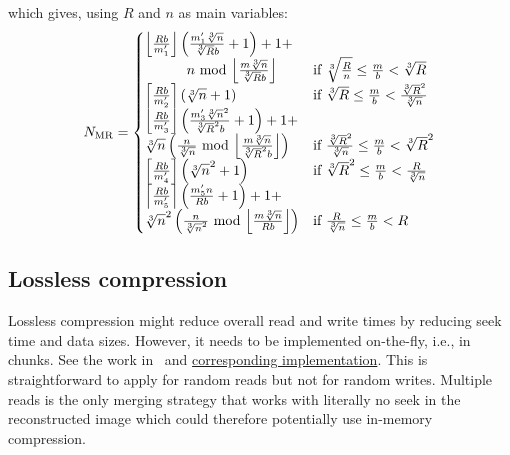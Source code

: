 \documentclass[10pt, conference, compsocconf]{IEEEtran}
\DeclarePairedDelimiter{\ceil}{\lceil}{\rceil}
\DeclarePairedDelimiter{\floor}{\lfloor}{\rfloor}
\begin{document}
which gives, using $R$ and $n$ as main variables:
\begin{equation}
N_\mathrm{MR} =
\begin{cases}
  \floor*{\frac{Rb}{m_1'}}\left(\frac{m_1'\sqrt[3]{n}}{\sqrt[3]{R}b}+1\right)+1+\\
  \quad \quad \quad n \text{ mod }\floor*{\frac{m\sqrt[3]{n}}{\sqrt[3]{R}b}}\
  & \text{if } \sqrt[3]{\frac{R}{n}} \leq \frac{m}{b} < \sqrt[3]{R}\\

  \ceil*{\frac{Rb}{m_2'}}\left(\sqrt[3]{n}+1\right)\
  & \text{if } \sqrt[3]{R} \leq \frac{m}{b} < \frac{\sqrt[3]{R}^2}{\sqrt[3]{n}}\\

  \floor*{\frac{Rb}{m_3'}}\left(\frac{m'_3\sqrt[3]{n}^2}{\sqrt[3]{R}^2b}+1\right)+1+\\
  \sqrt[3]{n}\left( \frac{n}{\sqrt[3]{n}} \text{ mod } \floor*{\frac{m\sqrt[3]{n}}{\sqrt[3]{R}^2b}} \right)
  & \text{if } \frac{\sqrt[3]{R}^2}{\sqrt[3]{n}} \leq \frac{m}{b} < \sqrt[3]{R}^2\\

  \ceil*{\frac{Rb}{m_4'}}\left(\sqrt[3]{n}^2+1\right)\
  & \text{if } \sqrt[3]{R}^2 \leq \frac{m}{b} < \frac{R}{\sqrt[3]{n}}\\

  \ceil*{\frac{Rb}{m_5'}}\left(\frac{m_5'n}{Rb}+1\right)+1+\\
  \sqrt[3]{n}^2\left( \frac{n}{\sqrt[3]{n}^2} \text{ mod } \floor*{\frac{m\sqrt[3]{n}}{Rb}}\right)
  & \text{if } \frac{R}{\sqrt[3]{n}} \leq \frac{m}{b} < R
\end{cases} \label{eq:seeks-multiple-reads}
\end{equation}


\subsection{Lossless compression}

Lossless compression might reduce overall read and write times by
reducing seek time and data sizes. However, it needs to be implemented
on-the-fly, i.e., in chunks. See the work in~\cite{rajna2015speeding}
and
\href{https://github.com/pauldmccarthy/indexed\_gzip}{corresponding
  implementation}. This is straightforward to apply for random reads
but not for random writes. Multiple reads is the only merging strategy
that works with literally no seek in the reconstructed image which
could therefore potentially use in-memory compression.
\end{document}
